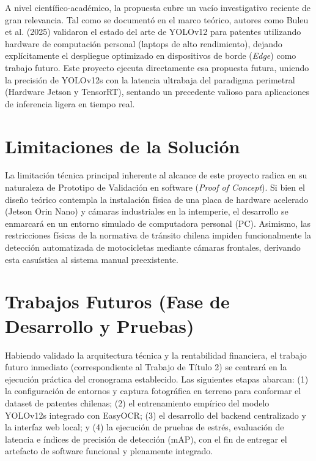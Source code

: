 A nivel científico-académico, la propuesta cubre un vacío investigativo reciente de gran relevancia. Tal como se documentó en el marco teórico, autores como Buleu et al. (2025) validaron el estado del arte de YOLOv12 para patentes utilizando hardware de computación personal (laptops de alto rendimiento), dejando explícitamente el despliegue optimizado en dispositivos de borde (\textit{Edge}) como trabajo futuro. Este proyecto ejecuta directamente esa propuesta futura, uniendo la precisión de YOLOv12s con la latencia ultrabaja del paradigma perimetral (Hardware Jetson y TensorRT), sentando un precedente valioso para aplicaciones de inferencia ligera en tiempo real.

\section*{Limitaciones de la Solución}

La limitación técnica principal inherente al alcance de este proyecto radica en su naturaleza de Prototipo de Validación en software (\textit{Proof of Concept}). Si bien el diseño teórico contempla la instalación física de una placa de hardware acelerado (Jetson Orin Nano) y cámaras industriales en la intemperie, el desarrollo se enmarcará en un entorno simulado de computadora personal (PC). Asimismo, las restricciones físicas de la normativa de tránsito chilena impiden funcionalmente la detección automatizada de motocicletas mediante cámaras frontales, derivando esta casuística al sistema manual preexistente.

\section*{Trabajos Futuros (Fase de Desarrollo y Pruebas)}

Habiendo validado la arquitectura técnica y la rentabilidad financiera, el trabajo futuro inmediato (correspondiente al Trabajo de Título 2) se centrará en la ejecución práctica del cronograma establecido. Las siguientes etapas abarcan: (1) la configuración de entornos y captura fotográfica en terreno para conformar el dataset de patentes chilenas; (2) el entrenamiento empírico del modelo YOLOv12s integrado con EasyOCR; (3) el desarrollo del backend centralizado y la interfaz web local; y (4) la ejecución de pruebas de estrés, evaluación de latencia e índices de precisión de detección (mAP), con el fin de entregar el artefacto de software funcional y plenamente integrado.
